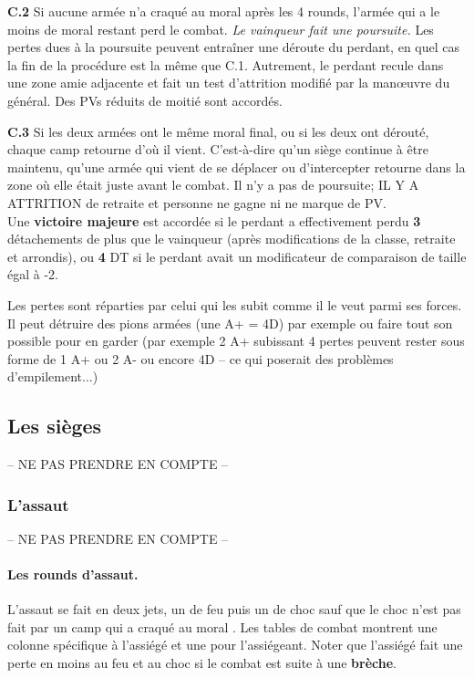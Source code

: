 {\bf C.2} Si aucune armée n'a craqué au moral après les 4 rounds, l'armée qui a le moins de moral restant perd
le combat. \textit{Le vainqueur fait une poursuite.} Les pertes dues à la poursuite
peuvent entraîner une déroute du perdant, en quel cas la fin de la procédure est la même
que C.1. Autrement, le perdant recule dans une zone amie adjacente et fait un test d'attrition
modifié par la man{\oe}uvre du général. Des PVs réduits de moitié sont accordés.

{\bf C.3} Si les deux armées ont le même moral final, ou si les deux ont dérouté,
chaque camp retourne d'où il vient. C'est-à-dire qu'un siège continue à être maintenu, qu'une
armée qui vient de se déplacer ou d'intercepter retourne dans la zone où elle était juste
avant le combat. Il n'y a pas de poursuite; IL Y A ATTRITION de retraite et personne ne gagne
ni ne marque de PV.\\

Une \textbf{victoire majeure} est accordée si le perdant a effectivement perdu
\textbf{3} détachements
de plus que le vainqueur (après modifications de la classe, retraite et arrondis),
ou \textbf{4} DT si le perdant avait un modificateur de comparaison de taille
égal à -2.

Les pertes sont réparties par celui qui les subit comme il le veut parmi ses forces.
Il peut détruire des pions armées (une A+ = 4D) par exemple ou faire tout son
possible pour en garder (par exemple 2 A+ subissant 4 pertes peuvent rester sous
forme de 1 A+ ou 2 A- ou encore 4D -- ce qui poserait des problèmes d'empilement...)

\subsection{Les sièges}
-- NE PAS PRENDRE EN COMPTE --


\subsubsection{L'assaut}
-- NE PAS PRENDRE EN COMPTE --


\paragraph{Les rounds d'assaut.}
L'assaut se fait en deux jets, un de feu puis un de choc sauf que
le choc n'est pas fait par un camp qui a craqué au moral .
Les tables de combat montrent une colonne spécifique à l'assiégé et une pour l'assiégeant.
Noter que l'assiégé fait une perte en moins au feu et au choc si le combat est
suite à une \textbf{brèche}.


